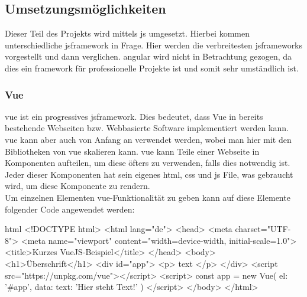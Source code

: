 \subsection{Umsetzungsmöglichkeiten}
Dieser Teil des Projekts wird mittels \Gls{js} umgesetzt. Hierbei kommen unterschiedliche \Gls{jsframework} in Frage. Hier werden die verbreitesten \Gls{jsframework}s vorgestellt und dann verglichen. \Gls{angular} wird nicht in Betrachtung gezogen, da dies ein \Gls{framework}  für professionelle Projekte ist und somit sehr umständlich ist\cite{angular_ex}.
\subsubsection{Vue}
\gls{vue} ist ein progressives \Gls{jsframework}. Dies bedeutet, dass Vue in bereits bestehende Webseiten bzw. Webbasierte Software implementiert werden kann.\\
\Gls{vue} kann aber auch von Anfang an verwendet werden, wobei man hier mit den Bibliotheken von \Gls{vue} skalieren kann\cite{vuedoc}. \Gls{vue} kann Teile einer Webseite in Komponenten aufteilen, um diese öfters zu verwenden, falls dies notwendig ist. Jeder dieser Komponenten hat sein eigenes \Gls{html}, \Gls{css} und \Gls{js} File, was gebraucht wird, um diese Komponente zu rendern.\\
Um einzelnen Elementen \Gls{vue}-Funktionalität zu geben kann auf diese Elemente folgender Code angewendet werden\cite{vuedoc}:
\begin{code}{html}
	<!DOCTYPE html>
	<html lang="de">
		<head>
			<meta charset="UTF-8">
			<meta name="viewport" content="width=device-width, initial-scale=1.0">
			<title>Kurzes VueJS-Beispiel</title>
		</head>
		<body>
			<h1>Überschrift</h1>
			<div id="app">
				<p> {{ text }} </p>
			</div>
			<script src="https://unpkg.com/vue"></script>
			<script>
				const app = new Vue({
					el: '#app',
					data: {
						text: 'Hier steht Text!'
					}
				})
			</script>
		</body>
	</html>
\end{code}
